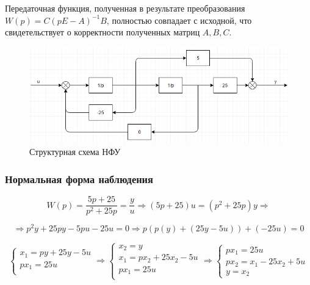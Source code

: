 \documentclass[14pt,a4paper,report]{report}
\begin{document}
Передаточная функция, полученная в результате преобразования $W(p)=C(pE-A)^{-1}B$, полностью совпадает с исходной, что свидетельствует о корректности полученных матриц  $A, B, C$. 

\begin{figure}[h!]
	\centering
	\includegraphics[scale = 0.73]{images/nfu.png}
	\caption{Структурная схема НФУ}
	\label{image:1}
\end{figure}

\subsubsection{Нормальная форма наблюдения}

\begin{equation*}
\text{$W(p)=\frac{5p+25}{p^2+25p}=\frac{y}{u}$}
\Longrightarrow
\text{$(5p+25)u=(p^2+25p)y$}
\Longrightarrow
\end{equation*}

\begin{equation*}
\Longrightarrow
\text{$p^2y+25py-5pu-25u=0$}
\Longrightarrow
\text{$p(p(y)+(25y-5u))+(-25u)=0$}
\end{equation*}

\begin{equation*}
\begin{cases}
	\text{$x_1=py+25y-5u$} \\
	\text{$px_1=25u$} \\
\end{cases}
\Longrightarrow
\begin{cases}
	\text{$x_2=y$}\\
	\text{$x_1=px_2+25x_2-5u$} \\
	\text{$px_1=25u$} \\
\end{cases}
\Longrightarrow
\begin{cases}
	\text{$px_1=25u$} \\
	\text{$px_2=x_1-25x_2+5u$} \\
	\text{$y=x_2$}
\end{cases}
\end{equation*}
\end{document}
